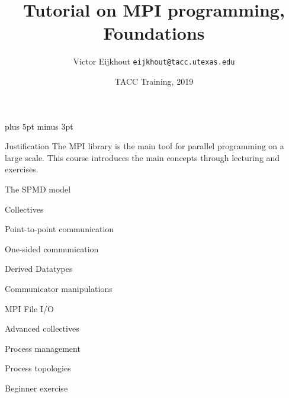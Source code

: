 \documentclass[11pt,headernav]{beamer}
\def\Location{TACC Training, 2019}
\def\TitleExtra{, Foundations}
\begin{document}
\parskip=10pt plus 5pt minus 3pt

\title{Tutorial on MPI programming\TitleExtra}
\author{Victor Eijkhout {\tt eijkhout@tacc.utexas.edu}}
\date{\Location}

\begin{frame}
  \titlepage
\end{frame}

  \begin{frame}{Justification}
    The MPI library is the main tool
    for parallel programming on a large scale.
    This course introduces the main concepts
    through lecturing and exercises.
  \end{frame}

   {The SPMD model}
  

   {Collectives}
  

   {Point-to-point communication}
  

   {One-sided communication}
   

   {Derived Datatypes}
  

   {Communicator manipulations}
  

   {MPI File I/O}
  

   {Advanced collectives}
  

   {Process management}
  

   {Process topologies}
  

   {Beginner exercise}

  \begin{exerciseframe}
    
  \end{exerciseframe}
\end{document}
